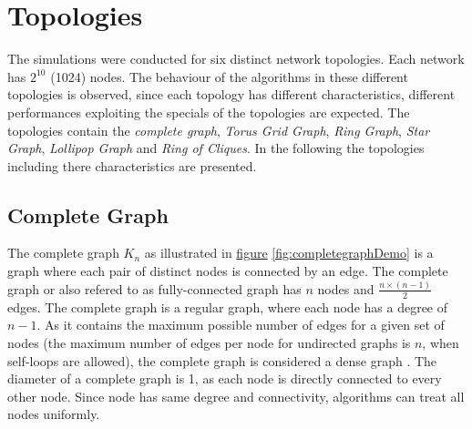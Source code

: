 \chapter{Topologies}\label{chap:topologies}
The simulations were conducted for six distinct network topologies. Each network has $2^{10}$ (1024) nodes. The behaviour of the algorithms in these different topologies is observed, since each topology has different characteristics, different performances exploiting the specials of the topologies are expected. The topologies contain the \textit{complete graph}, \textit{Torus Grid Graph}, \textit{Ring Graph}, \textit{Star Graph}, \textit{Lollipop Graph} and \textit{Ring of Cliques}. In the following the topologies including there characteristics are presented. 


\section{Complete Graph}\label{sec:2completegraph}
The complete graph $K_n$ as illustrated in \hyperref[fig:completegraphDemo]{figure} \ref{fig:completegraphDemo} is a graph where each pair of distinct nodes is connected by an edge. The complete graph or also refered to as fully-connected graph has $n$ nodes and $\frac{n\times(n-1)}{2}$ edges. The complete graph is a regular graph, where each node has a degree of $n-1$. As it contains the maximum possible number of edges for a given set of nodes (the maximum number of edges per node  for undirected graphs is $n$, when self-loops are allowed), the complete graph is considered a dense graph \cite{GraphTheorySchindelhaauer2021}. The diameter of a complete graph is 1, as each node is directly connected to every other node. Since node has same degree and connectivity, algorithms can treat all nodes uniformly. 

% 
%     
%  
